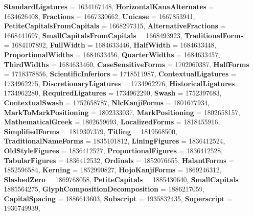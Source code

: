 \begin{DoxyCompactItemize}
\newline
{\bfseries Standard\+Ligatures} = 1634167148, 
{\bfseries Horizontal\+Kana\+Alternates} = 1634626408, 
{\bfseries Fractions} = 1667330662, 
{\bfseries Unicase} = 1667853941, 
\newline
{\bfseries Petite\+Capitals\+From\+Capitals} = 1668297315, 
{\bfseries Alternative\+Fractions} = 1668441697, 
{\bfseries Small\+Capitals\+From\+Capitals} = 1668493923, 
{\bfseries Traditional\+Forms} = 1684107892, 
\newline
{\bfseries Full\+Width} = 1684633446, 
{\bfseries Half\+Width} = 1684633448, 
{\bfseries Proportional\+Widths} = 1684633456, 
{\bfseries Quarter\+Widths} = 1684633457, 
\newline
{\bfseries Third\+Widths} = 1684633460, 
{\bfseries Case\+Sensitive\+Forms} = 1702060387, 
{\bfseries Half\+Forms} = 1718378856, 
{\bfseries Scientific\+Inferiors} = 1718511987, 
\newline
{\bfseries Contextual\+Ligatures} = 1734962275, 
{\bfseries Discretionary\+Ligatures} = 1734962276, 
{\bfseries Historical\+Ligatures} = 1734962280, 
{\bfseries Required\+Ligatures} = 1734962290, 
\newline
{\bfseries Swash} = 1752397683, 
{\bfseries Contextual\+Swash} = 1752658787, 
{\bfseries Nlc\+Kanji\+Forms} = 1801677934, 
{\bfseries Mark\+To\+Mark\+Positioning} = 1802333037, 
\newline
{\bfseries Mark\+Positioning} = 1802658157, 
{\bfseries Mathematical\+Greek} = 1802659693, 
{\bfseries Localized\+Forms} = 1818455916, 
{\bfseries Simplified\+Forms} = 1819307379, 
\newline
{\bfseries Titling} = 1819568500, 
{\bfseries Traditional\+Name\+Forms} = 1835101812, 
{\bfseries Lining\+Figures} = 1836412524, 
{\bfseries Old\+Style\+Figures} = 1836412527, 
\newline
{\bfseries Proportional\+Figures} = 1836412528, 
{\bfseries Tabular\+Figures} = 1836412532, 
{\bfseries Ordinals} = 1852076655, 
{\bfseries Halant\+Forms} = 1852596584, 
\newline
{\bfseries Kerning} = 1852990827, 
{\bfseries Hojo\+Kanji\+Forms} = 1869246312, 
{\bfseries Slashed\+Zero} = 1869768058, 
{\bfseries Petite\+Capitals} = 1885430640, 
\newline
{\bfseries Small\+Capitals} = 1885564275, 
{\bfseries Glyph\+Composition\+Decomposition} = 1886217059, 
{\bfseries Capital\+Spacing} = 1886613603, 
{\bfseries Subscript} = 1935832435, 
\newline
{\bfseries Superscript} = 1936749939, 

\end{DoxyCompactItemize}
